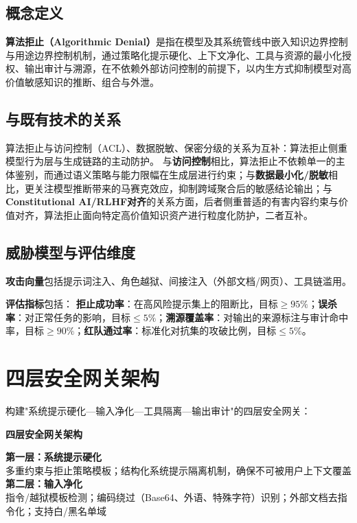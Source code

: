 \subsection{概念定义}

\textbf{算法拒止（Algorithmic Denial）}是指在模型及其系统管线中嵌入知识边界控制与用途边界控制机制，通过策略化提示硬化、上下文净化、工具与资源的最小化授权、输出审计与溯源，在不依赖外部访问控制的前提下，以内生方式抑制模型对高价值敏感知识的推断、组合与外泄。

\subsection{与既有技术的关系}

算法拒止与访问控制（ACL）、数据脱敏、保密分级的关系为互补：算法拒止侧重模型行为层与生成链路的主动防护。
与\textbf{访问控制}相比，算法拒止不依赖单一的主体鉴别，而通过语义策略与能力限幅在生成层进行约束；与\textbf{数据最小化/脱敏}相比，更关注模型推断带来的马赛克效应，抑制跨域聚合后的敏感结论输出；与\textbf{Constitutional AI/RLHF对齐}的关系方面，后者侧重普适的有害内容约束与价值对齐，算法拒止面向特定高价值知识资产进行粒度化防护，二者互补。

\subsection{威胁模型与评估维度}

\textbf{攻击向量}包括提示词注入、角色越狱、间接注入（外部文档/网页）、工具链滥用。

\textbf{评估指标}包括：
\textbf{拒止成功率}：在高风险提示集上的阻断比，目标$\geq 95\%$；\textbf{误杀率}：对正常任务的影响，目标$\leq 5\%$；\textbf{溯源覆盖率}：对输出的来源标注与审计命中率，目标$\geq 90\%$；\textbf{红队通过率}：标准化对抗集的攻破比例，目标$\leq 5\%$。

\section{四层安全网关架构}

构建"系统提示硬化—输入净化—工具隔离—输出审计"的四层安全网关：

\textbf{四层安全网关架构}

\small
\textbf{第一层：系统提示硬化}\\
多重约束与拒止策略模板；结构化系统提示隔离机制，确保不可被用户上下文覆盖\\[0.5em]

\textbf{第二层：输入净化}\\
指令/越狱模板检测；编码绕过（Base64、外语、特殊字符）识别；外部文档去指令化；支持白/黑名单域\\[0.5em]

